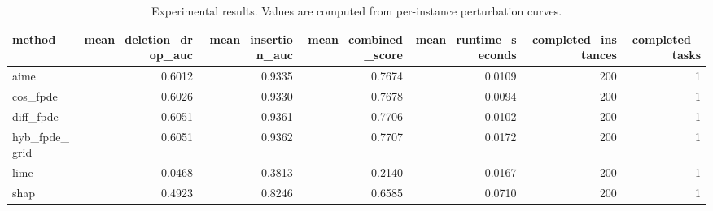 \begin{table}[t]
\caption{Experimental results. Values are computed from per-instance perturbation curves.}
\label{tab:main_results_computed}
\centering
\begin{tabular}{lrrrrrr}
\toprule
method & mean\_deletion\_drop\_auc & mean\_insertion\_auc & mean\_combined\_score & mean\_runtime\_seconds & completed\_instances & completed\_tasks \\
\midrule
aime & 0.6012 & 0.9335 & 0.7674 & 0.0109 & 200 & 1 \\
cos\_fpde & 0.6026 & 0.9330 & 0.7678 & 0.0094 & 200 & 1 \\
diff\_fpde & 0.6051 & 0.9361 & 0.7706 & 0.0102 & 200 & 1 \\
hyb\_fpde\_grid & 0.6051 & 0.9362 & 0.7707 & 0.0172 & 200 & 1 \\
lime & 0.0468 & 0.3813 & 0.2140 & 0.0167 & 200 & 1 \\
shap & 0.4923 & 0.8246 & 0.6585 & 0.0710 & 200 & 1 \\
\bottomrule
\end{tabular}

\end{table}
